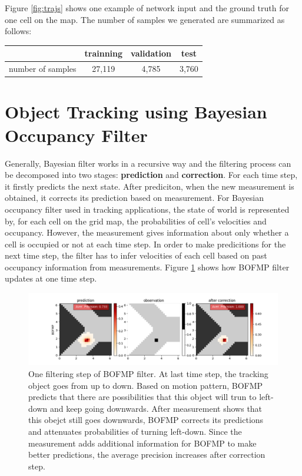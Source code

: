 Figure \ref{fig:trajs} shows one example of network input and the ground truth for one cell on the map. The number of samples we generated are summarized as follows:

\begin{center}
  \begin{tabular}{c|ccc}
    \hline
     & trainning & validation & test \\ \hline
    number of samples & 27,119 & 4,785 & 3,760\\
    \hline
  \end{tabular}
\end{center}

\section{Object Tracking using Bayesian Occupancy Filter}

Generally, Bayesian filter works in a recursive way and the filtering process can be decomposed into two stages: \textbf{prediction} and \textbf{correction}. For each time step, it firstly predicts the next state. After prediciton, when the new measurement is obtained, it corrects its prediction based on measurement. For Bayesian occupancy filter used in tracking applications, the state of world is represented by, for each cell on the grid map, the probabilities of cell's velocities and occupancy. However, the measurement gives information about only whether a cell is occupied or not at each time step. In order to make predicitions for the next time step, the filter has to infer velocities of each cell based on past occupancy information from measurements. Figure \ref{fig:correction} shows how BOFMP filter updates at one time step.


\begin{figure}[ht]
  \centering
   \captionsetup{width=\linewidth}
    \includegraphics[width=\textwidth]{figures/correction_step.png}
    \caption{One filtering step of BOFMP filter. At last time step, the tracking object goes from up to down. Based on motion pattern, BOFMP predicts that there are possibilities that this object will trun to left-down and keep going downwards. After measurement shows that this obejct still goes downwards, BOFMP corrects its predictions and attenuates probabilities of turning left-down. Since the measurement adds additional information for BOFMP to make better predictions, the average precision increases after correction step.}
    \label{fig:correction}
\end{figure}


